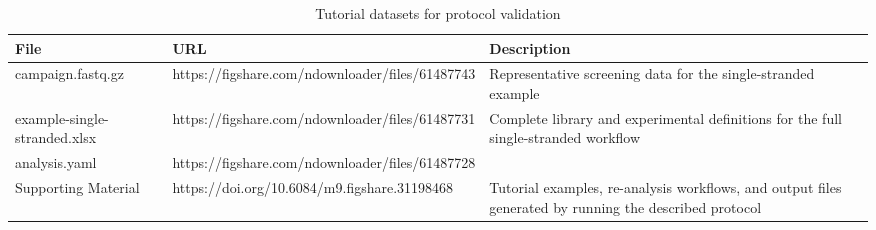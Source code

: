 \begin{table}[htbp]
\centering
\caption{Tutorial datasets for protocol validation}
\label{tab:table2}
\begin{tabular}{lll}
\toprule
File & URL & Description \\
\midrule
campaign.fastq.gz & https://figshare.com/ndownloader/files/61487743 & Representative screening data for the single-stranded example \\
example-single-stranded.xlsx & https://figshare.com/ndownloader/files/61487731 & Complete library and experimental definitions for the full single-stranded workflow \\
analysis.yaml & https://figshare.com/ndownloader/files/61487728 &  \\
Supporting Material & https://doi.org/10.6084/m9.figshare.31198468 & Tutorial examples, re-analysis workflows, and output files generated by running the described protocol \\
\bottomrule
\end{tabular}
\end{table}

